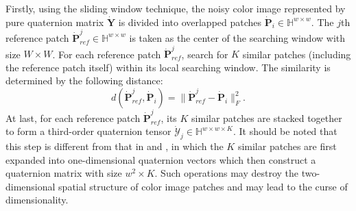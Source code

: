 \documentclass[journal]{IEEEtran}
\begin{document}
Firstly, using the sliding window technique, the noisy color image represented by pure quaternion matrix $\dot{\mathbf{Y}}$ is divided into overlapped patches $\dot{\mathbf{P}}_{i}\in\mathbb{H}^{w\times w}$. The $j$th reference patch $\dot{\mathbf{P}}_{ref}^{j}\in\mathbb{H}^{w\times w}$ is taken as the center of the searching window with size $W\times W$. For each reference patch $\dot{\mathbf{P}}_{ref}^{j}$, search for $K$ similar patches (including the reference patch itself) within its local searching window. The similarity is determined by the following distance:
\begin{equation*}
d(\dot{\mathbf{P}}_{ref}^{j},\dot{\mathbf{P}}_{i})=\|\dot{\mathbf{P}}_{ref}^{j}-\dot{\mathbf{P}}_{i}\|_{F}^{2}.
\end{equation*}
At last, for each reference patch $\dot{\mathbf{P}}_{ref}^{j}$, its $K$ similar patches are stacked together to form a third-order quaternion tensor $\dot{\mathcal{Y}}_{j}\in\mathbb{H}^{w\times w \times K}$. It should be noted that this step is different from that in \cite{DBLP:journals/tip/ChenXZ20} and \cite{DBLP:journals/ijon/YuZY19}, in which the $K$ similar patches are first expanded into one-dimensional quaternion vectors which then construct a quaternion matrix with size $w^2\times K$. Such operations may destroy the two-dimensional spatial structure of color image patches and may lead to the curse of dimensionality.
\end{document}
